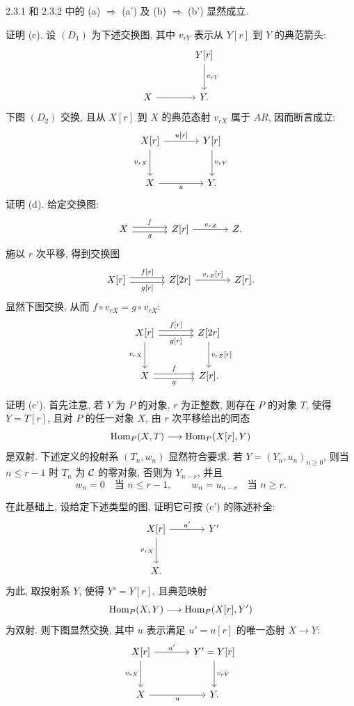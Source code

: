 \begin{prooftext}[证明]
2.3.1 和 2.3.2 中的 (a) $\Rightarrow$ (a') 及 (b) $\Rightarrow$ (b') 显然成立.

证明 (c). 设 $(D_1)$ 为下述交换图, 其中 $v_{rY}$ 表示从 $Y[r]$ 到 $Y$ 的典范箭头:
\[
\begin{tikzcd}[column sep=large,row sep=large]
& Y[r] \arrow[d,"{v_{rY}}"]\\
X \arrow[r] & Y .
\end{tikzcd}
\]
下图 $(D_2)$ 交换, 且从 $X[r]$ 到 $X$ 的典范态射 $v_{rX}$ 属于 $AR$, 因而断言成立:
\[
\begin{tikzcd}[column sep=large,row sep=large]
X[r] \arrow[r,"{u[r]}"] \arrow[d,"{v_{rX}}"'] & Y[r] \arrow[d,"{v_{rY}}"]\\
X \arrow[r,"u"'] & Y .
\end{tikzcd}
\]
证明 (d). 给定交换图:
\[
\begin{tikzcd}[column sep=large]
X \arrow[r,shift left,"f"] \arrow[r,shift right,"g"'] & Z[r] \arrow[r,"{v_{rZ}}"] & Z .
\end{tikzcd}
\]
施以 $r$ 次平移, 得到交换图
\[
\begin{tikzcd}[column sep=large]
X[r] \arrow[r,shift left,"{f[r]}"] \arrow[r,shift right,"{g[r]}"'] & Z[2r] \arrow[r,"{v_{rZ}[r]}"] & Z[r].
\end{tikzcd}
\]
显然下图交换, 从而 $f\circ v_{rX}=g\circ v_{rX}$:
\[
\begin{tikzcd}[column sep=large,row sep=large]
X[r] \arrow[r,shift left,"{f[r]}"] \arrow[r,shift right,"{g[r]}"'] \arrow[d,"{v_{rX}}"'] & Z[2r] \arrow[d,"{v_{rZ}[r]}"]\\
X \arrow[r,shift left,"f"] \arrow[r,shift right,"g"'] & Z[r] .
\end{tikzcd}
\]

证明 (c'). 首先注意, 若 $Y$ 为 $P$ 的对象, $r$ 为正整数, 则存在 $P$ 的对象 $T$, 使得 $Y=T[r]$, 且对 $P$ 的任一对象 $X$, 由 $r$ 次平移给出的同态
\[
\operatorname{Hom}_P(X,T)\longrightarrow\operatorname{Hom}_P(X[r],Y)
\]
是双射. 下述定义的投射系 $(T_n,w_n)$ 显然符合要求. 若 $Y=(Y_n,u_n)_{n\ge0}$, 则当 $n\le r-1$ 时 $T_n$ 为 $\mathcal C$ 的零对象, 否则为 $Y_{n-r}$, 并且
\[
w_n=0\quad\text{当 }n\le r-1,\qquad w_n=u_{n-r}\quad\text{当 }n\ge r.
\]

在此基础上, 设给定下述类型的图, 证明它可按 (c') 的陈述补全:
\[
\begin{tikzcd}[column sep=large,row sep=large]
X[r] \arrow[r,"u'"] \arrow[d,"{v_{rX}}"'] & Y'\\
X .
\end{tikzcd}
\]
为此, 取投射系 $Y$, 使得 $Y'=Y[r]$, 且典范映射
\[
\operatorname{Hom}_P(X,Y)\longrightarrow\operatorname{Hom}_P(X[r],Y')
\]
为双射. 则下图显然交换, 其中 $u$ 表示满足 $u'=u[r]$ 的唯一态射 $X\to Y$:
\[
\begin{tikzcd}[column sep=large,row sep=large]
X[r] \arrow[r,"u'"] \arrow[d,"{v_{rX}}"'] & Y'=Y[r] \arrow[d,"{v_{rY}}"]\\
X \arrow[r,"u"'] & Y .
\end{tikzcd}
\]


\end{prooftext}
